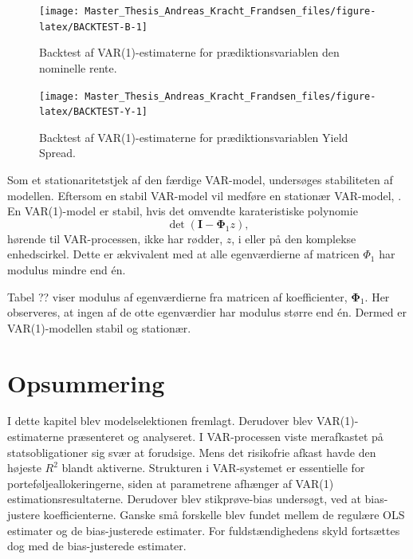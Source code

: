 \documentclass[
  a4paper,
  oneside]{memoir}
\begin{document}
\begin{figure}[H]

{\centering \texttt{[image: Master\_Thesis\_Andreas\_Kracht\_Frandsen\_files/figure-latex/BACKTEST-B-1]} 

}

\caption[short]{Backtest af VAR(1)-estimaterne for prædiktionsvariablen den nominelle rente.}\label{fig:BACKTEST-B}
\end{figure}

\begin{figure}[H]

{\centering \texttt{[image: Master\_Thesis\_Andreas\_Kracht\_Frandsen\_files/figure-latex/BACKTEST-Y-1]} 

}

\caption[short]{Backtest af VAR(1)-estimaterne for prædiktionsvariablen Yield Spread.}\label{fig:BACKTEST-Y}
\end{figure}

Som et stationaritetstjek af den færdige VAR-model, undersøges stabiliteten af modellen. Eftersom en stabil VAR-model vil medføre en stationær VAR-model, \citep{Lutkepohl2005}. En VAR(1)-model er stabil, hvis det omvendte karateristiske polynomie
\[\det\left(\bm{I} - \bm{\Phi}_1 z\right),\]
hørende til VAR-processen, ikke har rødder, \(z\), i eller på den komplekse enhedscirkel. Dette er ækvivalent med at alle egenværdierne af matricen \(\Phi_1\) har modulus mindre end én.

Tabel ?? viser modulus af egenværdierne fra matricen af koefficienter, \(\bm{\Phi}_1\). Her observeres, at ingen af de otte egenværdier har modulus større end én. Dermed er VAR(1)-modellen stabil og stationær.

\hypertarget{opsundermodel}{%
\section{Opsummering}\label{opsundermodel}}

I dette kapitel blev modelselektionen fremlagt. Derudover blev VAR(1)-estimaterne præsenteret og analyseret. I VAR-processen viste merafkastet på statsobligationer sig svær at forudsige. Mens det risikofrie afkast havde den højeste \(R^2\) blandt aktiverne. Strukturen i VAR-systemet er essentielle for porteføljeallokeringerne, siden at parametrene afhænger af VAR(1) estimationsresultaterne. Derudover blev stikprøve-bias undersøgt, ved at bias-justere koefficienterne. Ganske små forskelle blev fundet mellem de regulære OLS estimater og de bias-justerede estimater. For fuldstændighedens skyld fortsættes dog med de bias-justerede estimater.
\end{document}

